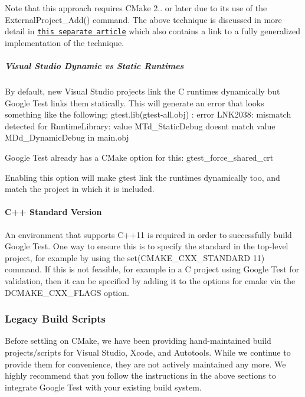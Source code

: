 Note that this approach requires C\+Make 2.. or later due to its use of the {\ttfamily External\+Project\+\_\+\+Add()} command. The above technique is discussed in more detail in \href{http://crascit.com/2015/07/25/cmake-gtest/}{\tt this separate article} which also contains a link to a fully generalized implementation of the technique.

\subparagraph*{Visual Studio Dynamic vs Static Runtimes}

By default, new Visual Studio projects link the C runtimes dynamically but Google Test links them statically. This will generate an error that looks something like the following\+: gtest.\+lib(gtest-\/all.\+obj) \+: error L\+N\+K2038\+: mismatch detected for \textquotesingle{}Runtime\+Library\textquotesingle{}\+: value \textquotesingle{}M\+Td\+\_\+\+Static\+Debug\textquotesingle{} doesn\textquotesingle{}t match value \textquotesingle{}M\+Dd\+\_\+\+Dynamic\+Debug\textquotesingle{} in main.\+obj

Google Test already has a C\+Make option for this\+: {\ttfamily gtest\+\_\+force\+\_\+shared\+\_\+crt}

Enabling this option will make gtest link the runtimes dynamically too, and match the project in which it is included.

\paragraph*{C++ Standard Version}

An environment that supports C++11 is required in order to successfully build Google Test. One way to ensure this is to specify the standard in the top-\/level project, for example by using the {\ttfamily set(\+C\+M\+A\+K\+E\+\_\+\+C\+X\+X\+\_\+\+S\+T\+A\+N\+D\+A\+R\+D 11)} command. If this is not feasible, for example in a C project using Google Test for validation, then it can be specified by adding it to the options for cmake via the {\ttfamily D\+C\+M\+A\+K\+E\+\_\+\+C\+X\+X\+\_\+\+F\+L\+A\+GS} option.

\subsubsection*{Legacy Build Scripts}

Before settling on C\+Make, we have been providing hand-\/maintained build projects/scripts for Visual Studio, Xcode, and Autotools. While we continue to provide them for convenience, they are not actively maintained any more. We highly recommend that you follow the instructions in the above sections to integrate Google Test with your existing build system.

